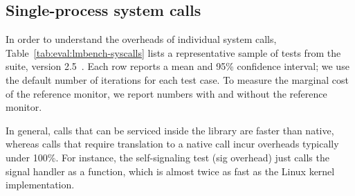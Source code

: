 \subsection{Single-process system calls}
\label{eval:perf:syscalls}


In order to understand the overheads of individual system calls,
Table~\ref{tab:eval:lmbench-syscalls} lists 
a representative sample of 
tests from the
\lmbench{} suite, version 2.5~\cite{McVoy:lmbench}.
Each row reports a mean and 95\% confidence interval;
we use the default number of iterations for each test case.
To measure the marginal cost of the reference monitor, we report numbers with and without 
the reference monitor.

In general, calls that can be serviced inside the library are faster than native,
whereas calls that require translation to a native call incur overheads typically under 100\%.
For instance, 
the self-signaling test (sig overhead)
just calls the signal handler as a function,
which is almost twice as fast
as the Linux kernel implementation.  

\begin{table}[htp!]

\caption{System call benchmark results based on \lmbench{} 2.5. Comparison is among (1) native Linux processes, (2) \graphene{} \picoprocs{} on Linux host, both without and with JIT-optimized SECCOMP filter ({\bf +SC}) and reference monitor ({\bf +RM}), and (3) \graphene{} in SGX enclaves.
System call latency is in microseconds, and lower is better.
System call bandwidth and throughput are in megabytes per second and operations per second, respectively, and higher is better. 
Overheads are relative to Linux \linuxversion{}; negative overheads indicate improved performance.} 
\label{tab:eval:lmbench-syscalls}
\end{table}








